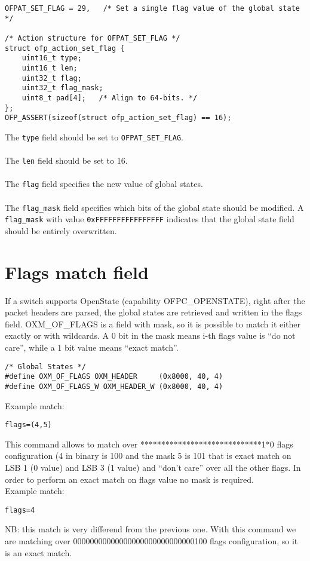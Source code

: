 \scriptsize\begin{verbatim}
OFPAT_SET_FLAG = 29,   /* Set a single flag value of the global state */

/* Action structure for OFPAT_SET_FLAG */
struct ofp_action_set_flag {
    uint16_t type;
    uint16_t len; 
    uint32_t flag;
    uint32_t flag_mask;   
    uint8_t pad[4];   /* Align to 64-bits. */
};
OFP_ASSERT(sizeof(struct ofp_action_set_flag) == 16);
\end{verbatim}\normalsize

\noindent
The \texttt{type} field should be set to \texttt{OFPAT\_SET\_FLAG}.
\\\\
The \texttt{len} field should be set to 16.
\\\\
The \texttt{flag} field specifies the new value of global states.
\\\\
The \texttt{flag\_mask} field specifies which bits of the global state should be modified. A \texttt{flag\_mask} with value \texttt{0xFFFFFFFFFFFFFFFF} indicates that the global state field should be entirely overwritten.

\section{Flags match field}
\label{section:oxm_of_flags}

If a switch supports OpenState (capability OFPC\_OPENSTATE), right after the packet headers are parsed, the global states are retrieved and written in the flags field. OXM\_OF\_FLAGS is a field with mask, so it is possible to match it either exactly or with wildcards. A 0 bit in the mask means i-th flags value is ``do not care'', while a 1 bit value means ``exact match''.

\scriptsize\begin{verbatim}
/* Global States */
#define OXM_OF_FLAGS OXM_HEADER     (0x8000, 40, 4)
#define OXM_OF_FLAGS_W OXM_HEADER_W (0x8000, 40, 4)
\end{verbatim}\normalsize
Example match:
\scriptsize\begin{verbatim}
flags=(4,5)
\end{verbatim}\normalsize
This command allows to match over *****************************1*0 flags configuration (4 in binary is 100 and the mask 5 is 101 that is exact match on LSB 1 (0 value) and LSB 3 (1 value) and ``don’t care'' over all the other flags. In order to perform an exact match on flags value no mask is required.
\\Example match:
\scriptsize\begin{verbatim}
flags=4
\end{verbatim}\normalsize
NB: this match is very differend from the previous one. With this command we are matching over 00000000000000000000000000000100 flags configuration, so it is an exact match.

